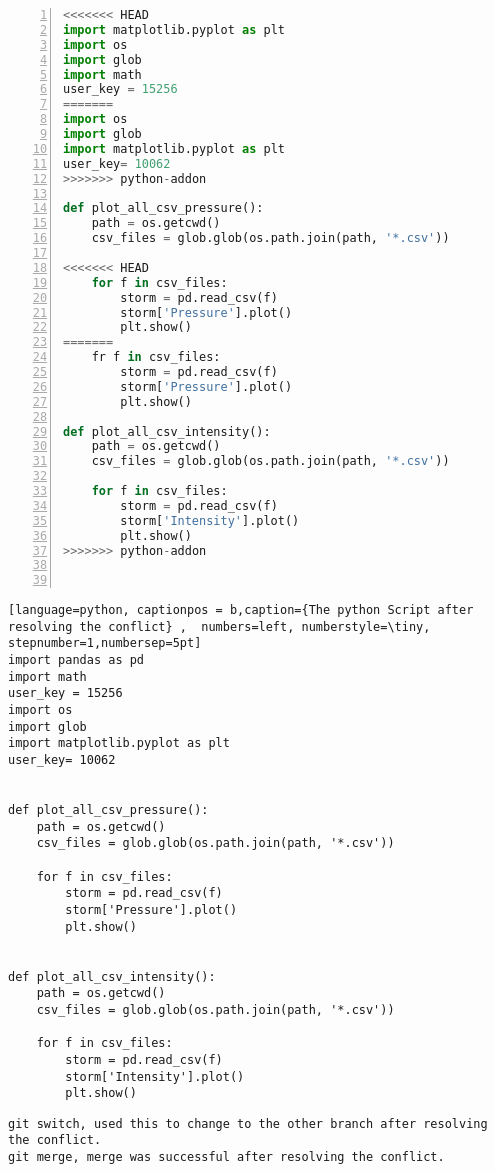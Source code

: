 \documentclass[12pt]{article}
\begin{document}
\begin{lstlisting}[language = python,captionpos = b, caption ={The python script before resolving the conflict}, numbers= left , numberstyle=\tiny, stepnumber=1,numbersep=5pt]
<<<<<<< HEAD
import matplotlib.pyplot as plt
import os
import glob
import math
user_key = 15256
=======
import os
import glob
import matplotlib.pyplot as plt
user_key= 10062
>>>>>>> python-addon

def plot_all_csv_pressure():
    path = os.getcwd()
    csv_files = glob.glob(os.path.join(path, '*.csv'))

<<<<<<< HEAD
    for f in csv_files:
        storm = pd.read_csv(f)
        storm['Pressure'].plot()
        plt.show()
=======
    fr f in csv_files:
        storm = pd.read_csv(f)
        storm['Pressure'].plot()
        plt.show()

def plot_all_csv_intensity():
    path = os.getcwd()
    csv_files = glob.glob(os.path.join(path, '*.csv'))

    for f in csv_files:
        storm = pd.read_csv(f)
        storm['Intensity'].plot()
        plt.show()
>>>>>>> python-addon

    
\end{lstlisting}


\newpage\begin{lstlisting}[language=python, captionpos = b,caption={The python Script after resolving the conflict} ,  numbers=left, numberstyle=\tiny, stepnumber=1,numbersep=5pt]
import pandas as pd
import math
user_key = 15256
import os
import glob
import matplotlib.pyplot as plt
user_key= 10062


def plot_all_csv_pressure():
    path = os.getcwd()
    csv_files = glob.glob(os.path.join(path, '*.csv'))
    
    for f in csv_files:
        storm = pd.read_csv(f)
        storm['Pressure'].plot()
        plt.show()

		
def plot_all_csv_intensity():
    path = os.getcwd()
    csv_files = glob.glob(os.path.join(path, '*.csv'))
    
    for f in csv_files:
        storm = pd.read_csv(f)
        storm['Intensity'].plot()
        plt.show()

\end{lstlisting}


\begin{verbatim}
git switch, used this to change to the other branch after resolving the conflict.
git merge, merge was successful after resolving the conflict.
\end{verbatim}
\end{document}

